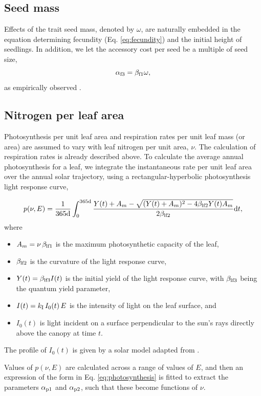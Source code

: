 \documentclass[10pt,twoside]{article}
\begin{document}
\subsection{Seed mass}

Effects of the trait seed mass, denoted by $\omega$, are naturally embedded in the equation determining
fecundity (Eq. \ref{eq:fecundity}) and the initial height of seedlings. In addition,
we let the accessory cost per seed be a multiple of seed size,
$$\alpha_{{\rm f3}} = \beta_{{\rm f1}} \omega,$$
as empirically observed \citep{Henery-2001}.

\subsection{Nitrogen per leaf area}

Photosynthesis per unit leaf area and respiration rates per unit leaf mass (or area)
are assumed to vary with leaf nitrogen per unit area, $\nu$. The calculation of respiration rates is already described above. To calculate the average annual photosynthesis for a leaf,
we integrate the instantaneous rate per unit leaf area over the annual solar trajectory,
using a rectangular-hyperbolic photosynthesis light response curve,

$$p(\nu, E) = \frac1{365 \textrm{d}}\int_0^{365 \textrm{d}}\frac{Y(t) + A_m - \sqrt{(Y(t) + A_m)^2 - 4 \beta_{{\rm lf2}} Y(t) A_m }}{2 \beta_{{\rm lf2}}} {\rm d}t,$$
where
\begin{itemize}
\item $A_m = \nu \, \beta_{{\rm lf1}}$ is the maximum photosynthetic capacity of the leaf,
\item $\beta_{{\rm lf2}}$ is the curvature of the light response curve,
\item $Y(t) = \beta_{{\rm lf3}} I(t)$ is the initial yield of the light response curve, with $\beta_{{\rm lf3}}$ being the quantum yield parameter,
\item $I(t) = k_{\rm I} \, I_0(t)\, E$ is the intensity of light on the leaf surface, and
\item $I_0(t)$ is light incident on a surface perpendicular to the sun's rays directly above the canopy at time $t$.
\end{itemize}
The profile of $I_0(t)$ is given by a solar model adapted from \citet{TerSteege-1997}.

Values of $p(\nu, E)$ are calculated across a range of values of $E$, and then an expression of the form in Eq. \ref{eq:photosynthesis} is fitted to extract the parameters
$\alpha_{{\rm p1}}$ and $\alpha_{{\rm p2}}$, such that these become functions of $\nu$.
\end{document}
